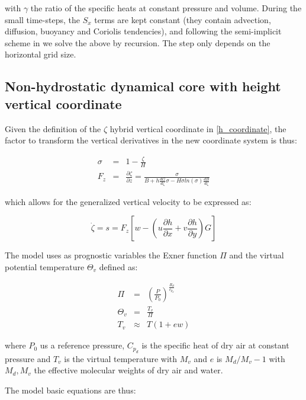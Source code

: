 with $\gamma$ the ratio of the specific heats at constant pressure and volume.
During the small time-steps, the $S_x$ terms are kept constant (they contain
advection, diffusion, buoyancy and Coriolis tendencies), and following the
semi-implicit scheme in \cite{Klemp_1978} we solve the above by recursion.
The step only depends on the horizontal grid size.

\subsection{Non-hydrostatic dynamical core with height vertical coordinate}

Given the definition of the $\zeta$ hybrid vertical coordinate in
\ref{h_coordinate}, the factor to transform the vertical derivatives in
the new coordinate system is thus:

\begin{eqnarray}
\sigma &=& 1 - \frac{\zeta}{H} \\
F_z &=& \frac{\partial \zeta}{\partial z} =
  \frac{\sigma}{B + h \frac{dG}{d\zeta}\sigma - H\sigma ln(\sigma)
  \frac{dB}{d\zeta}}
\end{eqnarray}

which allows for the generalized vertical velocity to be expressed as:

\begin{equation}
\dot{\zeta} = s = F_z \left[ w - 
              \left( u \frac{\partial h}{\partial x} +
                     v \frac{\partial h}{\partial y} \right) G \right]
\end{equation}

The model uses as prognostic variables the Exner function
$\Pi$ and the virtual potential temperature $\Theta_v$ defined as:

\begin{eqnarray}
  \Pi &=& \left(\frac{P}{P_0}\right)^{\frac{R_d}{c_{p_d}}} \\
  \Theta_v &=& \frac{T_v}{\Pi} \\
  T_v &\approx& T \left( 1 + e w \right)
\end{eqnarray}

where $P_0$ us a reference pressure, $C_{p_d}$ is the specific heat of dry
air at constant pressure and $T_v$ is the virtual temperature with $M_v$ and
$e$ is $M_d/M_v - 1$ with $M_d,M_v$ the effective molecular weights of dry air
and water.

The model basic equations are thus:

